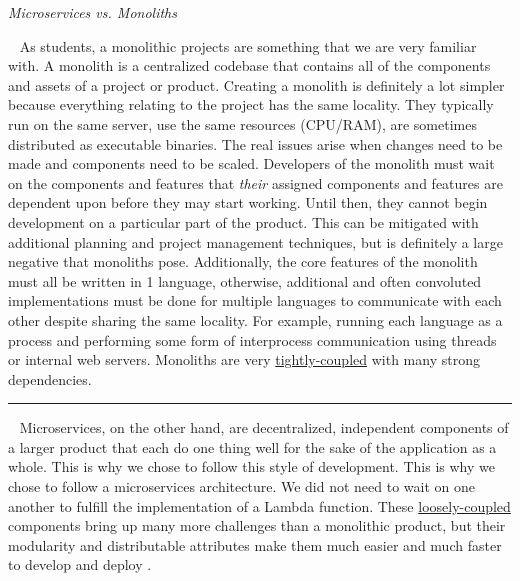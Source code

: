 \documentclass[10pt, a4paper]{article}
\begin{document}
\vspace{2mm}
\begin{tcolorbox}
	\emph{Microservices vs. Monoliths} \\
\par ~ As students, a monolithic projects are something that we are very familiar with. A monolith is a centralized codebase that contains all of the components and assets of a project or product. Creating a monolith is definitely a lot simpler because everything relating to the project has the same locality. They typically run on the same server, use the same resources (CPU/RAM), are sometimes distributed as executable binaries. The real issues arise when changes need to be made and components need to be scaled. Developers of the monolith must wait on the components and features that \emph{their} assigned components and features are dependent upon before they may start working. Until then, they cannot begin development on a particular part of the product. This can be mitigated with additional planning and project management techniques, but is definitely a large negative that monoliths pose. Additionally, the core features of the monolith must all be written in 1 language, otherwise, additional and often convoluted implementations must be done for multiple languages to communicate with each other despite sharing the same locality. For example, running each language as a process and performing some form of interprocess communication using threads or internal web servers. Monoliths are very \underline{tightly-coupled} with many strong dependencies.

\vspace{2mm}
\hrule
\vspace{2mm}

\par ~ Microservices, on the other hand, are decentralized, independent components of a larger product that each do one thing well for the sake of the application as a whole. This is why we chose to follow this style of development. This is why we chose to follow a microservices architecture. We did not need to wait on one another to fulfill the implementation of a Lambda function. These \underline{loosely-coupled} components bring up many more challenges than a monolithic product, but their modularity and distributable attributes make them much easier and much faster to develop and deploy \cite{two}. 
\end{tcolorbox}
	
\end{document}

